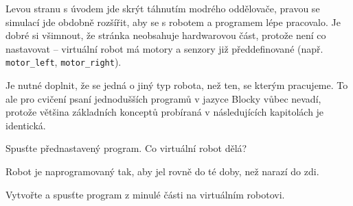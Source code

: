 \documentclass[main.tex]{subfiles}
\begin{document}
	Levou stranu s úvodem jde skrýt táhnutím modrého oddělovače, pravou se simulací jde obdobně rozšířit, aby se s robotem a programem lépe pracovalo. Je dobré si všimnout, že stránka neobsahuje hardwarovou část, protože není co nastavovat -- virtuální robot má motory a senzory již předdefinované (např. \texttt{motor\_left}, \texttt{motor\_right}).

	Je nutné doplnit, že se jedná o jiný typ robota, než ten, se kterým pracujeme. To ale pro cvičení psaní jednodušších programů v jazyce Blocky vůbec nevadí, protože většina základních konceptů probíraná v následujících kapitolách je identická.

	\begin{question}
		Spusťte přednastavený program. Co virtuální robot dělá?
	\end{question}

	\begin{solution}
		Robot je naprogramovaný tak, aby jel rovně do té doby, než narazí do zdi.
	\end{solution}

	\begin{question}
		Vytvořte a spusťte program z minulé části na virtuálním robotovi.
	\end{question}
\end{document}
